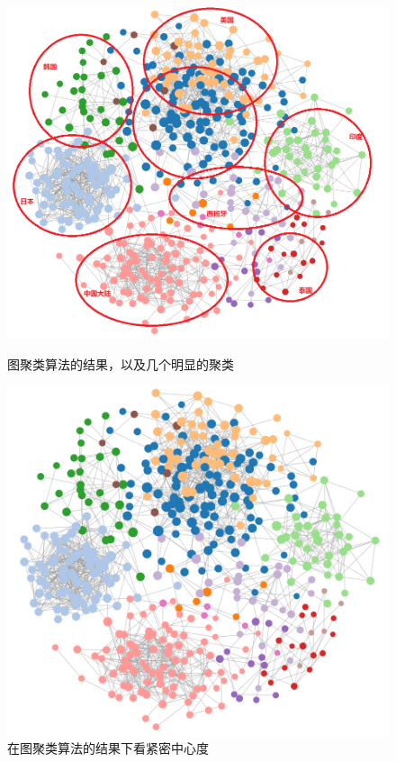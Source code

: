 \documentclass[UTF8, onecolumn, a4paper]{article}
\begin{document}
\begin{center}
	\begin{figure}[ht] %
		\centering %
		\begin{minipage}[b]{0.95\linewidth} %
			\begin{minipage}[b]{0.47\linewidth} %
				\centering
				\includegraphics[width=\linewidth]{../pictures/new1}
				\caption{图聚类算法的结果，以及几个明显的聚类}
			\end{minipage}
			\hfill
			\begin{minipage}[b]{0.46\linewidth}
				\centering
				\includegraphics[width=\linewidth]{../pictures/new2}
				\caption{在图聚类算法的结果下看紧密中心度}
			\end{minipage}
		\end{minipage}
	\end{figure}
\end{center}
\end{document}
